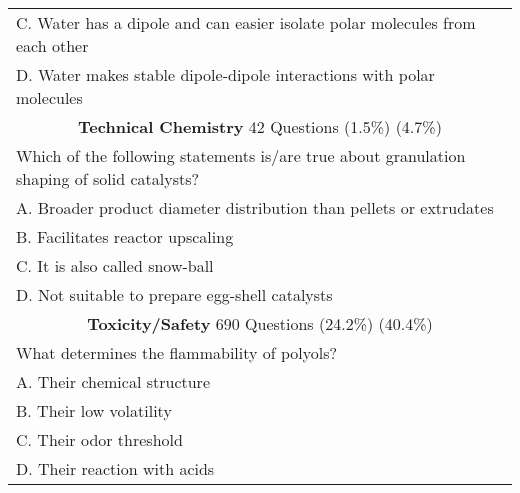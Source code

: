 \begin{table}
{\begin{tabularx}{\textwidth}{X}
            C. Water has a dipole and can easier isolate polar molecules from each other \\
            D. Water makes stable dipole-dipole interactions with polar molecules \\
            \midrule
            \multicolumn{1}{c}{\textbf{Technical Chemistry} 42 Questions (1.5\%) (4.7\%)} \\
            \midrule
            Which of the following statements is/are true about granulation shaping of solid catalysts? \\
            A. Broader product diameter distribution than pellets or extrudates \\
            B. Facilitates reactor upscaling \\
            C. It is also called snow-ball \\
            D. Not suitable to prepare egg-shell catalysts \\
            \midrule
            \multicolumn{1}{c}{\textbf{Toxicity/Safety} 690 Questions (24.2\%) (40.4\%)} \\
            \midrule
            What determines the flammability of polyols? \\
            A. Their chemical structure \\
            B. Their low volatility \\
            C. Their odor threshold \\
            D. Their reaction with acids \\
            \bottomrule
        \end{tabularx}
    }
\end{table}

\normalsize

